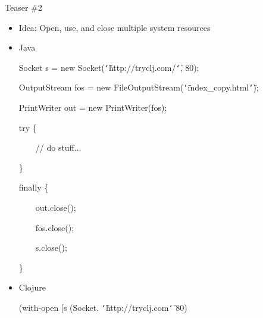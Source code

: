 \documentclass{beamer}
\renewcommand{\textquotedbl}{\texttt{\char`\"}}
\begin{document}
\begin{frame}[allowframebreaks]{Teaser \#2}
  \begin{itemize}
  \item Idea: Open, use, and close multiple system resources
  \item Java\\
\begin{small}
{\ttfamily\color{black}
%
\textcolor[rgb]{0.13333334,0.54509807,0.13333334}{Socket}
\textcolor[rgb]{0.627451,0.32156864,0.1764706}{s} =
\textcolor[rgb]{0.49803922,0.0,0.49803922}{new}
\textcolor[rgb]{0.13333334,0.54509807,0.13333334}{Socket}(\textcolor[rgb]{0.54509807,0.13333334,0.32156864}{{\textquotedbl}http://tryclj.com/{\textquotedbl}},
80);}

{\ttfamily\color{black}
\textcolor[rgb]{0.13333334,0.54509807,0.13333334}{OutputStream}
\textcolor[rgb]{0.627451,0.32156864,0.1764706}{fos} =
\textcolor[rgb]{0.49803922,0.0,0.49803922}{new}
\textcolor[rgb]{0.13333334,0.54509807,0.13333334}{FileOutputStream}(\textcolor[rgb]{0.54509807,0.13333334,0.32156864}{{\textquotedbl}index\_copy.html{\textquotedbl}});}

{\ttfamily\color{black}
\textcolor[rgb]{0.13333334,0.54509807,0.13333334}{PrintWriter}
\textcolor[rgb]{0.627451,0.32156864,0.1764706}{out} =
\textcolor[rgb]{0.49803922,0.0,0.49803922}{new}
\textcolor[rgb]{0.13333334,0.54509807,0.13333334}{PrintWriter}(fos);}

{\ttfamily\color{black}
\textcolor[rgb]{0.49803922,0.0,0.49803922}{try} \{}

{\ttfamily\color{black}
\ \ \ \ \textcolor[rgb]{0.69803923,0.13333334,0.13333334}{// do
stuff...}}

{\ttfamily\color{black}
\}}

{\ttfamily\color{black}
\textcolor[rgb]{0.49803922,0.0,0.49803922}{finally} \{}

{\ttfamily\color{black}
\ \ \ \ out.close();}

{\ttfamily\color{black}
\ \ \ \ fos.close();}

{\ttfamily\color{black}
\ \ \ \ s.close();}

{\ttfamily\color{black}
\}}
\end{small}
  \item Clojure \\
\begin{small}
{\ttfamily\color{black}
%
\textcolor[rgb]{0.54901963,0.54901963,0.54901963}{(}\textcolor[rgb]{0.49803922,0.0,0.49803922}{with-open}
[s
\textcolor[rgb]{0.54901963,0.54901963,0.54901963}{(}\textcolor[rgb]{0.28235295,0.23921569,0.54509807}{Socket.}
\textcolor[rgb]{0.54509807,0.13333334,0.32156864}{{\textquotedbl}http://tryclj.com{\textquotedbl}}
80\textcolor[rgb]{0.54901963,0.54901963,0.54901963}{)}}


\end{small}
\end{itemize}
\end{frame}
\end{document}
